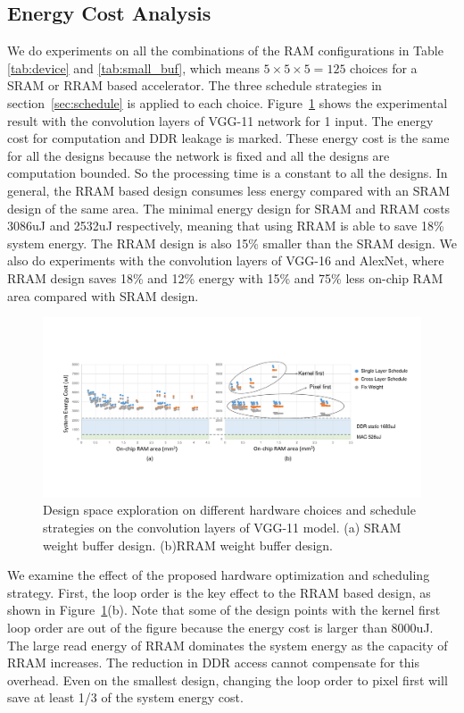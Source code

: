 \subsection{Energy Cost Analysis}
We do experiments on all the combinations of the RAM configurations in Table \ref{tab:device} and \ref{tab:small_buf}, which means $5\times 5\times 5 = 125$ choices for a SRAM or RRAM based accelerator. The three schedule strategies in section~\ref{sec:schedule} is applied to each choice. Figure~\ref{fig:design_space} shows the experimental result with the convolution layers of VGG-11 network for 1 input. The energy cost for computation and DDR leakage is marked. These energy cost is the same for all the designs because the network is fixed and all the designs are computation bounded. So the processing time is a constant to all the designs. In general, the RRAM based design consumes less energy compared with an SRAM design of the same area. The minimal energy design for SRAM and RRAM costs 3086uJ and 2532uJ respectively, meaning that using RRAM is able to save 18\% system energy. The RRAM design is also 15\% smaller than the SRAM design. We also do experiments with the convolution layers of VGG-16 and AlexNet, where RRAM design saves 18\% and 12\% energy with 15\% and 75\% less on-chip RAM area compared with SRAM design.

\begin{figure}[t]
  \centering
  \includegraphics[width=2\columnwidth]{fig/design_space.pdf}
  \vspace{-5pt}
  \caption{Design space exploration on different hardware choices and schedule strategies on the convolution layers of VGG-11 model. (a) SRAM weight buffer design. (b)RRAM weight buffer design.}
  \label{fig:design_space}
\end{figure}

We examine the effect of the proposed hardware optimization and scheduling strategy. First, the loop order is the key effect to the RRAM based design, as shown in Figure~\ref{fig:design_space}(b). Note that some of the design points with the kernel first loop order are out of the figure because the energy cost is larger than 8000uJ. The large read energy of RRAM dominates the system energy as the capacity of RRAM increases. The reduction in DDR access cannot compensate for this overhead. Even on the smallest design, changing the loop order to pixel first will save at least 1/3 of the system energy cost. 

